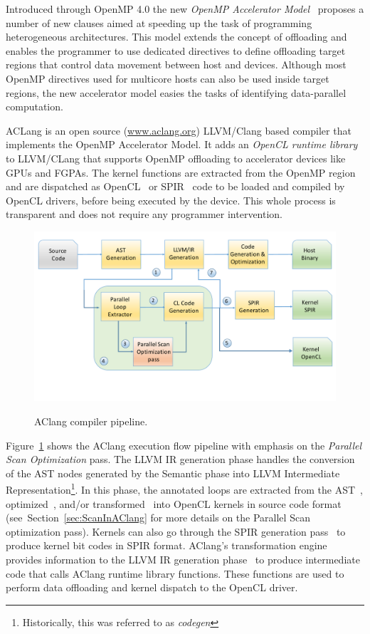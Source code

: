 \documentclass[Ingles]{ic-tese-v1}
\newcommand{\rsec}[1]{Section~\ref{sec:#1}}
\newcommand{\rfig}[1]{Figure~\ref{fig:#1}}
\newcommand{\tit}[1]{{\textit{#1}}}
\begin{document}
Introduced  through   OpenMP  4.0  the  new   \tit{OpenMP  Accelerator
Model}~\cite{Liao2013}  proposes a  number of  new clauses  aimed at
speeding up the task  of programming heterogeneous architectures. This
model extends the concept of  offloading and enables the programmer to
use  dedicated directives  to  define offloading  target regions  that
control data movement between host  and devices.  Although most OpenMP
directives used  for multicore  hosts can also  be used  inside target
regions, the  new accelerator  model easies  the tasks  of identifying
data-parallel computation.

ACLang is an  open  source (\url{www.aclang.org})  LLVM/Clang
based compiler that implements the  OpenMP Accelerator Model.  It adds
an {\em  OpenCL runtime  library} to  LLVM/CLang that  supports OpenMP
offloading to  accelerator devices  like GPUs  and FGPAs.   The kernel
functions are extracted  from the OpenMP region and  are dispatched as
OpenCL~\cite{opencl}  or  SPIR~\cite{spir}  code   to  be  loaded  and
compiled by OpenCL  drivers, before being executed by  the device. This
whole  process is  transparent  and does  not  require any  programmer
intervention.

\begin{figure}[t]
	\caption{AClang compiler pipeline.}
	\centering
	\includegraphics[scale=0.45]{images/aclang_scan.pdf}
	\label{fig:aclang}
\end{figure}


\rfig{aclang} shows  the AClang execution flow  pipeline with
emphasis on the \textit{Parallel Scan Optimization} pass.  The
LLVM IR generation phase handles the conversion of the AST
nodes  generated   by  the  Semantic  phase   into  LLVM  Intermediate
Representation\footnote{Historically,   this  was   referred  to   as
	\textit{codegen}}.  In this phase, the annotated loops are extracted
from     the      AST~,     optimized~,     and/or
transformed~  into  OpenCL  kernels in  source  code  format~
(see~\rsec{ScanInAClang}   for  more   details   on  the   Parallel Scan
optimization pass).   Kernels can also go  through the SPIR
generation pass~ to produce kernel bit codes in SPIR format.
AClang's  transformation engine~  provides information
to  the LLVM  IR generation  phase~ to  produce intermediate
code  that  calls  AClang   runtime  library  functions.   These
functions are used  to perform data offloading and  kernel dispatch to
the  OpenCL  driver.
\end{document}
